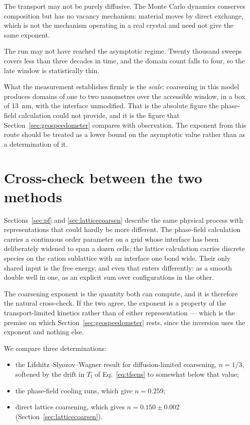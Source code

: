 \documentclass[11pt,a4paper]{article}
\newcommand{\Tf}{T_{\mathrm{f}}}
\begin{document}
The transport may not be purely diffusive. The Monte Carlo dynamics conserves
composition but has no vacancy mechanism: material moves by direct exchange,
which is not the mechanism operating in a real crystal and need not give the
same exponent.

The run may not have reached the asymptotic regime. Twenty thousand sweeps
covers less than three decades in time, and the domain count falls to four, so
the late window is statistically thin.

What the measurement establishes firmly is the \emph{scale}: coarsening in this
model produces domains of one to two nanometres over the accessible window, in
a box of 13~nm, with the interface unmodified. That is the absolute figure the
phase-field calculation could not provide, and it is the figure that
Section~\ref{sec:geospeedometer} compares with observation. The exponent from
this route should be treated as a lower bound on the asymptotic value rather
than as a determination of it.

\section{Cross-check between the two methods}
\label{sec:crosscheck}

Sections~\ref{sec:pf} and \ref{sec:latticecoarsen} describe the same physical
process with representations that could hardly be more different. The
phase-field calculation carries a continuous order parameter on a grid whose
interface has been deliberately widened to span a dozen cells; the lattice
calculation carries discrete species on the cation sublattice with an interface
one bond wide. Their only shared input is the free energy, and even that enters
differently: as a smooth double well in one, as an explicit sum over
configurations in the other.

The coarsening exponent is the quantity both can compute, and it is therefore
the natural cross-check. If the two agree, the exponent is a property of the
transport-limited kinetics rather than of either representation --- which is the
premise on which Section~\ref{sec:geospeedometer} rests, since the inversion
uses the exponent and nothing else.

We compare three determinations:
\begin{itemize}\itemsep2pt
\item the Lifshitz--Slyozov--Wagner result for diffusion-limited coarsening,
      $n = 1/3$, softened by the drift in $\Tf$ of Eq.~\eqref{eq:tfsens} to
      somewhat below that value;
\item the phase-field cooling runs, which give $n = 0.259$;
\item direct lattice coarsening, which gives $n = 0.150 \pm 0.002$
      (Section~\ref{sec:latticecoarsen}).
\end{itemize}
\end{document}
